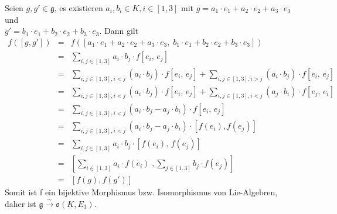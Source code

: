 \documentclass[12pt,leqno,twoside]{book}
\newcommand{\g}{\mathfrak g}
\newcommand{\lrxa}[1]{\xrightarrow{#1}}
\newcommand{\barcl}{\begin{array}{rcl}}
\newcommand{\ea}{\end{array}}
\begin{document}
Seien  $g,g' \in \g$, es existieren $a_i, b_i\in K, i\in[1,3]$ mit $g = a_1\cdot e_1 + a_2\cdot e_2 + a_3\cdot e_3$ und\\ $g' = b_1\cdot e_1 + b_2\cdot e_2 + b_3\cdot e_3$.
Dann gilt
\[
\barcl
f([g,g']) & = & f([a_1\cdot e_1 + a_2\cdot e_2 + a_3\cdot e_3,\;b_1\cdot e_1 + b_2\cdot e_2 + b_3\cdot e_3])\\
		  & = & \sum\limits_{i,j\in[1,3]} a_i\cdot b_j \cdot f[e_i,\,e_j]\\
		  & = & \sum\limits_{i,j\in[1,3],i<j}  (a_i\cdot b_j) \cdot f[e_i,\,e_j]+\sum\limits_{i,j\in[1,3],i>j} (a_i\cdot b_j) \cdot f[e_i,\,e_j]\\
		  & = & \sum\limits_{i,j\in[1,3],i<j}  (a_i\cdot b_j) \cdot f[e_i,\,e_j] + \sum\limits_{i,j\in[1,3],i<j} (a_j\cdot b_i) \cdot f[e_j,\,e_i]\\
		  & = & \sum\limits_{i,j\in[1,3],i<j} (a_i\cdot b_j - a_j\cdot b_i)\cdot f[e_i,\,e_j]\\
		  & = & \sum\limits_{i,j\in[1,3],i<j} (a_i\cdot b_j - a_j\cdot b_i)\cdot [f(e_i),f(e_j)]\\
		  & = & \sum\limits_{i,j\in[1,3]} a_i\cdot b_j \cdot [f(e_i),\,f(e_j)]\\
		  & = & [\sum\limits_{i\in[1,3]}a_i\cdot f(e_i) \;, \sum\limits_{j\in[1,3]}b_j\cdot f(e_j)]\\
		  & = & [f(g),f(g')]
\ea
\]
Somit ist f ein bijektive Morphismus bzw. Isomorphismus von Lie-Algebren, daher ist \linebreak $\g \lrxa{\sim}\mathfrak{o}(K,E_3)$.
\end{document}
